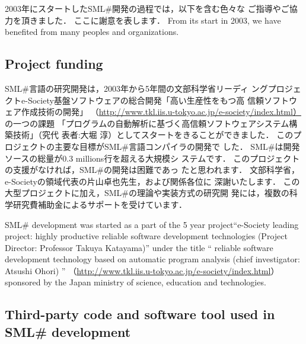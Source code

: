 \documentclass{jbook}
\newcommand{\txt}[2]{#2}
\newcommand{\smlsharp}{SML\#}
\newcommand{\smlsharpSize}{\txt{30万}{0.3 millions}}
\begin{document}
\ifjp%
	2003年にスタートした\smlsharp{}開発の過程では，以下を含む色々な
ご指導やご協力を頂きました．
	ここに謝意を表します．
\else%
	From its start in 2003, we have benefited from many peoples and
organizations.
\fi%
	
\subsection{\txt{プロジェクトファンディング}{Project funding}}

\ifjp%
	\smlsharp{}言語の研究開発は，2003年から5年間の文部科学省リーディ
ングプロジェクトe-Society基盤ソフトウェアの総合開発「高い生産性をもつ高
信頼ソフトウェア作成技術の開発」
（\url{http://www.tkl.iis.u-tokyo.ac.jp/e-society/index.html）}
の一つの課題
「プログラムの自動解析に基づく高信頼ソフトウェアシステム構築技術」（究代
表者:大堀 淳）としてスタートをきることができました．
	このプロジェクトの主要な目標が\smlsharp{}言語コンパイラの開発で
した．
	\smlsharp{}は開発ソースの総量が\smlsharpSize{}行を超える大規模シ
ステムです．
	このプロジェクトの支援がなければ，\smlsharp{}の開発は困難であっ
たと思われます．
	文部科学省，e-Societyの領域代表の片山卓也先生，および関係各位に
深謝いたします．
	この大型プロジェクトに加え，\smlsharp{}の理論や実装方式の研究開
発には，複数の科学研究費補助金によるサポートを受けています．

\else%
	\smlsharp{} development was started as a part of the 5 year
project``e-Society leading project: highly productive reliable software
development technologies (Project Director: Professor Takuya Katayama)'' 
under the title
``
reliable software development technology based on automatic program analysis
(chief investigator: Atsushi Ohori)
''
（\url{http://www.tkl.iis.u-tokyo.ac.jp/e-society/index.html}）
sponsored by the Japan ministry of science, education and technologies.

\fi%

\subsection{
\txt{\smlsharp{}が使用しているソフトウエア}
    {Third-party code and software tool used in \smlsharp{} development}
}
\end{document}

